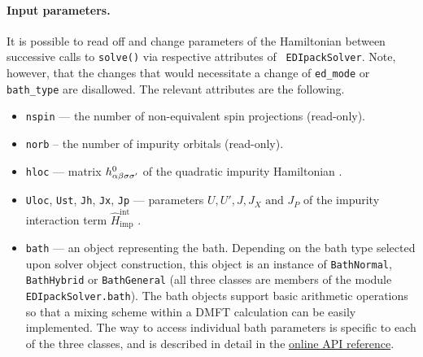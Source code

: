 \documentclass[edipack_sp.tex]{subfiles}
\begin{document}
\paragraph{{\bf Input parameters}.}
It is possible to read off and change parameters of the Hamiltonian between
successive calls to {\tt solve()} via respective attributes of {\tt 
EDIpackSolver}. Note, however, that the changes that would necessitate a change of {\tt ed\_mode} or {\tt bath\_type} are disallowed. The relevant attributes
are the following.
\begin{itemize}
    \item {\tt nspin} --- the number of non-equivalent spin projections 
          (read-only).
    \item {\tt norb} -- the number of impurity orbitals (read-only).
    \item {\tt hloc} --- matrix $h^0_{\alpha\beta\sigma\sigma'}$ of
          the quadratic impurity Hamiltonian .
    \item {\tt Uloc}, {\tt Ust}, {\tt Jh}, {\tt Jx}, {\tt Jp} ---
          parameters $U, U', J, J_X \text{ and } J_P$ of the impurity
          interaction term $\hat{H}^\mathrm{int}_\mathrm{imp}$ .
    \item {\tt bath} --- an object representing the bath. Depending on the
          bath type selected upon solver object construction, this object is an
          instance of {\tt BathNormal}, {\tt BathHybrid} or {\tt BathGeneral}
          (all three classes are members of the module
          {\tt EDIpackSolver.bath}). The bath objects support basic arithmetic
          operations so that a mixing scheme within a DMFT calculation can be
          easily implemented. The way to access individual bath parameters is
          specific to each of the three classes, and is described in detail in the       \href{https://krivenko.github.io/edipack2triqs/documentation.html\#module-edipack2triqs.bath}{online API reference}.
\end{itemize}
\end{document}
